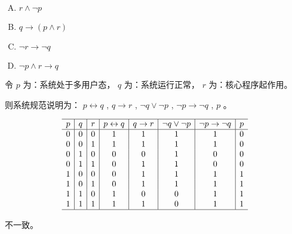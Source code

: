 {{        %
        \begin{practices}
            \begin{enumerate}[A.]
                \item $r \wedge \neg p$
                \item $q \rightarrow (p \wedge r)$
                \item $\neg r \rightarrow \neg q$
                \item $\neg p \wedge r \rightarrow q$
            \end{enumerate}
        \end{practices}

        \begin{practices}
            令 $p$ 为：系统处于多用户态， $q$ 为：系统运行正常， $r$ 为：核心程序起作用。

            则系统规范说明为： $p \leftrightarrow q$ , $q \rightarrow r$ , $\neg q \vee \neg p$ , $\neg p \rightarrow \neg q$ , $p$ 。

            \begin{table}[H]
                \[
                    \begin{array}{c|c|c|c|c|c|c|c}
                        \hline
                        p & q & r & p \leftrightarrow q & q \rightarrow r & \neg q \vee \neg p & \neg p \rightarrow \neg q & p \\
                        \hline
                        0 & 0 & 0 & 1 & 1 & 1 & 1 & 0 \\
                        0 & 0 & 1 & 1 & 1 & 1 & 1 & 0 \\
                        0 & 1 & 0 & 0 & 0 & 1 & 0 & 0 \\
                        0 & 1 & 1 & 0 & 1 & 1 & 0 & 0 \\
                        1 & 0 & 0 & 0 & 1 & 1 & 1 & 1 \\
                        1 & 0 & 1 & 0 & 1 & 1 & 1 & 1 \\
                        1 & 1 & 0 & 1 & 0 & 0 & 1 & 1 \\
                        1 & 1 & 1 & 1 & 1 & 0 & 1 & 1 \\
                        \hline
                    \end{array}
                \]
            \end{table}

            不一致。
        \end{practices}

}}
